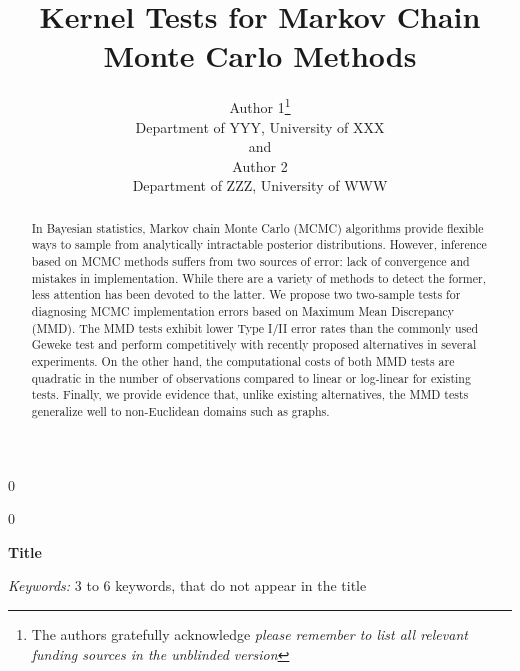 \documentclass[a4paper,12pt]{article}
\newcommand{\blind}{0}
\begin{document}
%

\def\spacingset#1{\renewcommand{\baselinestretch}%
{#1}\small\normalsize} \spacingset{1}



\blind
{
  \title{\bf Kernel Tests for Markov Chain Monte Carlo Methods}
  \author{Author 1\thanks{
    The authors gratefully acknowledge \textit{please remember to list all relevant funding sources in the unblinded version}}\hspace{.2cm}\\
    Department of YYY, University of XXX\\
    and \\
    Author 2 \\
    Department of ZZZ, University of WWW}
  \maketitle
} \fi

\blind
{
  \bigskip
  \bigskip
  \bigskip
  \begin{center}
    {\LARGE\bf Title}
\end{center}
  \medskip
} \fi

\bigskip
\begin{abstract}
    In Bayesian statistics, Markov chain Monte Carlo (MCMC) algorithms provide flexible ways to sample from analytically intractable posterior distributions. However, inference based on MCMC methods suffers from two sources of error: lack of convergence and mistakes in implementation. While there are a variety of methods to detect the former, less attention has been devoted to the latter. We propose two two-sample tests for diagnosing MCMC implementation errors based on Maximum Mean Discrepancy (MMD). The MMD tests exhibit lower Type I/II error rates than the commonly used Geweke test \cite{geweke_getting_2004} and perform competitively with recently proposed alternatives in several experiments. On the other hand, the computational costs of both MMD tests are quadratic in the number of observations compared to linear or log-linear for existing tests. Finally, we provide evidence that, unlike existing alternatives, the MMD tests generalize well to non-Euclidean domains such as graphs.
\end{abstract}

\noindent%
{\it Keywords:}  3 to 6 keywords, that do not appear in the title
\vfill
\end{document}
